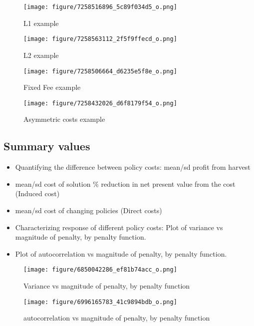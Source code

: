 \documentclass[review, 12pt]{elsarticle}
\begin{document}
  \begin{figure}
    \begin{center}
 \texttt{[image: figure/7258516896\_5c89f034d5\_o.png]}
 \caption{L1 example}
  \end{center}
\end{figure}

  \begin{figure}
    \begin{center}
 \texttt{[image: figure/7258563112\_2f5f9ffecd\_o.png]}
  \end{center}
 \caption{L2 example}
\end{figure}


  \begin{figure}
    \begin{center}
 \texttt{[image: figure/7258506664\_d6235e5f8e\_o.png]}
  \end{center}
 \caption{Fixed Fee example}
\end{figure}


  \begin{figure}
    \begin{center}
 \texttt{[image: figure/7258432026\_d6f8179f54\_o.png]}
  \end{center}
 \caption{Asymmetric costs example}
\end{figure}

\subsection{Summary values}

\begin{itemize}
\item  Quantifying the difference between policy costs: mean/sd profit from harvest
\item  mean/sd cost of solution \% reduction in net present value from the  cost (Induced cost)
\item  mean/sd cost of changing policies (Direct costs)
\item  Characterizing response of different policy costs: Plot of variance vs magnitude of penalty, by penalty function.
\item  Plot of autocorrelation vs magnitude of penalty, by penalty function.
\end{itemize}

  \begin{figure}
    \begin{center}
    \texttt{[image: figure/6850042286\_ef81b74acc\_o.png]}
    \caption{Variance vs magnitude of penalty, by penalty function}
  \end{center}
\end{figure}
  \begin{figure}
    \begin{center}
   \texttt{[image: figure/6996165783\_41c9894bdb\_o.png]}
    \caption{autocorrelation vs magnitude of penalty, by penalty function}
  \end{center}
\end{figure}
\end{document}
